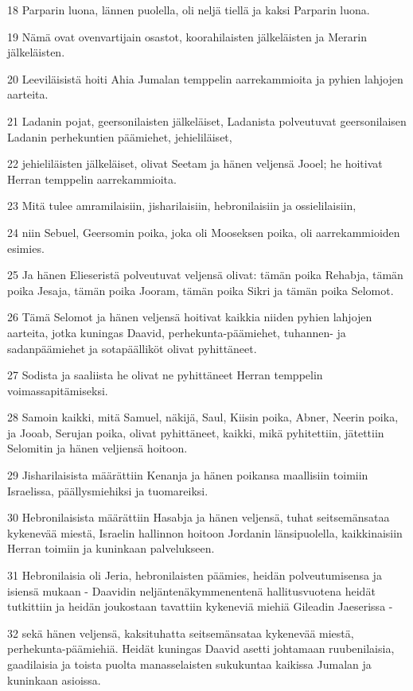 \par 18 Parparin luona, lännen puolella, oli neljä tiellä ja kaksi Parparin luona.
\par 19 Nämä ovat ovenvartijain osastot, koorahilaisten jälkeläisten ja Merarin jälkeläisten.
\par 20 Leeviläisistä hoiti Ahia Jumalan temppelin aarrekammioita ja pyhien lahjojen aarteita.
\par 21 Ladanin pojat, geersonilaisten jälkeläiset, Ladanista polveutuvat geersonilaisen Ladanin perhekuntien päämiehet, jehieliläiset,
\par 22 jehieliläisten jälkeläiset, olivat Seetam ja hänen veljensä Jooel; he hoitivat Herran temppelin aarrekammioita.
\par 23 Mitä tulee amramilaisiin, jisharilaisiin, hebronilaisiin ja ossielilaisiin,
\par 24 niin Sebuel, Geersomin poika, joka oli Mooseksen poika, oli aarrekammioiden esimies.
\par 25 Ja hänen Elieseristä polveutuvat veljensä olivat: tämän poika Rehabja, tämän poika Jesaja, tämän poika Jooram, tämän poika Sikri ja tämän poika Selomot.
\par 26 Tämä Selomot ja hänen veljensä hoitivat kaikkia niiden pyhien lahjojen aarteita, jotka kuningas Daavid, perhekunta-päämiehet, tuhannen- ja sadanpäämiehet ja sotapäälliköt olivat pyhittäneet.
\par 27 Sodista ja saaliista he olivat ne pyhittäneet Herran temppelin voimassapitämiseksi.
\par 28 Samoin kaikki, mitä Samuel, näkijä, Saul, Kiisin poika, Abner, Neerin poika, ja Jooab, Serujan poika, olivat pyhittäneet, kaikki, mikä pyhitettiin, jätettiin Selomitin ja hänen veljiensä hoitoon.
\par 29 Jisharilaisista määrättiin Kenanja ja hänen poikansa maallisiin toimiin Israelissa, päällysmiehiksi ja tuomareiksi.
\par 30 Hebronilaisista määrättiin Hasabja ja hänen veljensä, tuhat seitsemänsataa kykenevää miestä, Israelin hallinnon hoitoon Jordanin länsipuolella, kaikkinaisiin Herran toimiin ja kuninkaan palvelukseen.
\par 31 Hebronilaisia oli Jeria, hebronilaisten päämies, heidän polveutumisensa ja isiensä mukaan - Daavidin neljäntenäkymmenentenä hallitusvuotena heidät tutkittiin ja heidän joukostaan tavattiin kykeneviä miehiä Gileadin Jaeserissa -
\par 32 sekä hänen veljensä, kaksituhatta seitsemänsataa kykenevää miestä, perhekunta-päämiehiä. Heidät kuningas Daavid asetti johtamaan ruubenilaisia, gaadilaisia ja toista puolta manasselaisten sukukuntaa kaikissa Jumalan ja kuninkaan asioissa.

